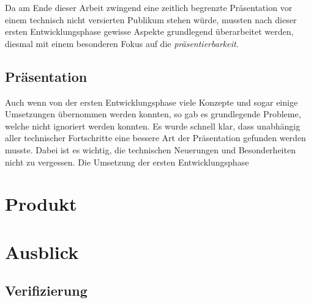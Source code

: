 \documentclass[11pt]{article}
\begin{document}
\noindent Da am Ende dieser Arbeit zwingend eine zeitlich begrenzte
Präsentation vor einem technisch nicht versierten Publikum stehen
würde, mussten nach dieser ersten Entwicklungsphase gewisse Aspekte
grundlegend überarbeitet werden, diesmal mit einem besonderen Fokus
auf die \emph{präsentierbarkeit}.  
\subsection{Präsentation}
\label{sec:org63b636b}
Auch wenn von der ersten Entwicklungsphase viele Konzepte und sogar
einige Umsetzungen übernommen werden konnten, so gab es grundlegende
Probleme, welche nicht ignoriert werden konnten. Es wurde schnell
klar, dass unabhängig aller technischer Fortschritte eine bessere Art
der Präsentation gefunden werden musste. Dabei ist es wichtig, die
technischen Neuerungen und Besonderheiten nicht zu vergessen. Die
Umsetzung der ersten Entwicklungsphase 
\section{Produkt}
\label{sec:org9e58874}
\section{Ausblick}
\label{sec:org93fd78a}
\subsection{Verifizierung}
\label{sec:org54c23ae}
\end{document}
